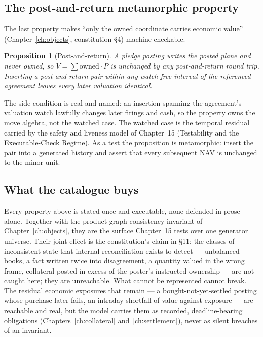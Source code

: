 \documentclass[11pt,a4paper]{article}
\newtheorem{proposition}[definition]{Proposition}
\begin{document}
\subsection{The post-and-return metamorphic property}

The last property makes ``only the owned coordinate carries economic value''
(Chapter~\ref{ch:objects}, constitution \S 4) machine-checkable.

\begin{proposition}[Post-and-return]\label{prop:postreturn}
A pledge posting writes the posted plane and never owned, so $V=\sum
\mathrm{owned}\cdot P$ is unchanged by any post-and-return round trip. Inserting a
post-and-return pair within any watch-free interval of the referenced agreement
leaves every later valuation identical.
\end{proposition}

The side condition is real and named: an insertion spanning the agreement's
valuation watch lawfully changes later firings and cash, so the property owns the
move algebra, not the watched case. The watched case is the temporal residual
carried by the safety and liveness model of Chapter~15 (Testability and the
Executable-Check Regime). As a test the proposition is metamorphic: insert the
pair into a generated history and assert that every subsequent NAV is unchanged to
the minor unit.

\subsection{What the catalogue buys}

Every property above is stated once and executable, none defended in prose alone.
Together with the product-graph consistency invariant of
Chapter~\ref{ch:objects}, they are the surface Chapter~15 tests over one
generator universe. Their joint effect is the constitution's claim in \S 11: the
classes of inconsistent state that internal reconciliation exists to detect ---
unbalanced books, a fact written twice into disagreement, a quantity valued in the
wrong frame, collateral posted in excess of the poster's instructed ownership --- are
not caught here; they are unreachable. What cannot be represented cannot break. The
residual economic exposures that remain --- a bought-not-yet-settled posting whose
purchase later fails, an intraday shortfall of value against exposure --- are reachable
and real, but the model carries them as recorded, deadline-bearing obligations
(Chapters~\ref{ch:collateral} and~\ref{ch:settlement}), never as silent breaches of an
invariant.
\end{document}
